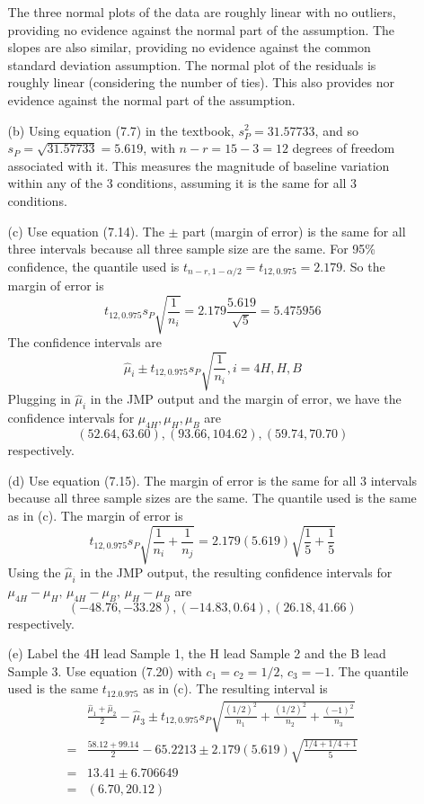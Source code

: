 \documentclass{article}\usepackage[]{graphicx}\usepackage[]{color}
\begin{document}
\begin{enumerate}
\begin{itemize}
  The three normal plots of the data are roughly linear with no outliers, providing no evidence against the normal part of the assumption. The slopes are also similar, providing no evidence against the common standard deviation assumption. The normal plot of the residuals is roughly linear (considering the number of ties). This also provides nor evidence against the normal part of the assumption.
  
  \item[(b)]
  Using equation (7.7) in the textbook, $s_P^2 = 31.57733$, and so $s_P = \sqrt{31.57733} = 5.619$, with $n - r = 15 - 3 = 12$ degrees of freedom associated with it. This measures the magnitude of baseline variation within any of the 3 conditions, assuming it is the same for all 3 conditions.
  
  \item[(c)]
  Use equation (7.14). The $\pm$ part (margin of error) is the same for all three intervals because all three sample size are the same. For 95\% confidence, the quantile used is $t_{n - r, 1 - \alpha/2} = t_{12, 0.975} = 2.179$. So the margin of error is
  \[t_{12, 0.975} s_P \sqrt{\frac{1}{n_i}} = 2.179 \frac{5.619}{\sqrt{5}} = 5.475956\]
  The confidence intervals are 
  \[\hat{\mu}_i \pm t_{12, 0.975} s_P \sqrt{\frac{1}{n_i}}, i = 4H, H, B\]
  Plugging in $\hat{\mu}_i$ in the JMP output and the margin of error, we have the confidence intervals for $\mu_{4H}, \mu_{H}, \mu_{B}$ are  
  \[(52.64, 63.60), (93.66, 104.62), (59.74, 70.70)\]
  respectively.
  
  \item[(d)]
  Use equation (7.15). The margin of error is the same for all 3 intervals because all three sample sizes are the same. The quantile used is the same as in (c). The margin of error is
  \[t_{12, 0.975} s_P \sqrt{\frac{1}{n_i} + \frac{1}{n_j}} = 2.179 (5.619)\sqrt{\frac{1}{5} + \frac{1}{5}}\]
  Using the $\hat{\mu}_i$ in the JMP output, the resulting confidence intervals for $\mu_{4H} - \mu_{H},\, \mu_{4H} - \mu_{B},\, \mu_{H} - \mu_{B}$ are 
  \[(-48.76, -33.28), (-14.83, 0.64), (26.18, 41.66)\]
  respectively.
  
  \item[(e)]
  Label the 4H lead Sample 1, the H lead Sample 2 and the B lead Sample 3. Use equation (7.20) with $c_1 = c_2 = 1/2,\, c_3 = -1$. The quantile used is the same $t_{12. 0.975}$ as in (c). The resulting interval is
  \begin{align*}
  &\frac{\hat{\mu}_1 + \hat{\mu}_2}{2} - \hat{\mu}_3 \pm t_{12, 0.975} s_P \sqrt{\frac{(1/2)^2}{n_1} + \frac{(1/2)^2}{n_2} + \frac{(-1)^2}{n_3}}\\
  =& \frac{58.12 + 99.14}{2} - 65.2213 \pm 2.179 (5.619) \sqrt{\frac{1/4 + 1/4 + 1}{5}}\\
  =& 13.41 \pm 6.706649\\
  =& (6.70, 20.12)
  \end{align*}
  

\end{itemize}
\end{enumerate}
\end{document}
